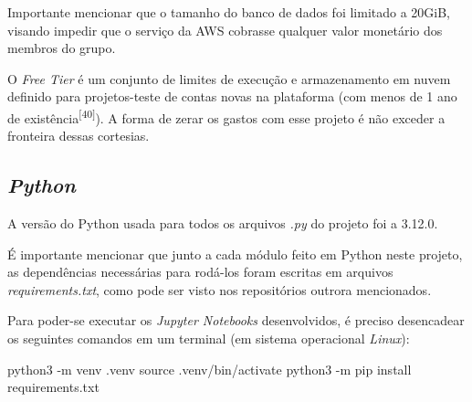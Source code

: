     Importante mencionar que o tamanho do banco de dados foi limitado a 20GiB, visando impedir que o serviço da AWS cobrasse qualquer valor monetário dos membros do grupo.
    
    O \textit{Free Tier} é um conjunto de limites de execução e armazenamento em nuvem definido para projetos-teste de contas novas na plataforma (com menos de 1 ano de existência\textsuperscript{[40]}). A forma de zerar os gastos com esse projeto é não exceder a fronteira dessas cortesias.

    
    \subsection{\textit{Python}} 

    A versão do Python usada para todos os arquivos \textit{.py} do projeto foi a 3.12.0.

    É importante mencionar que junto a cada módulo feito em Python neste projeto, as dependências necessárias para rodá-los foram escritas em arquivos \textit{requirements.txt}, como pode ser visto nos repositórios outrora mencionados.



    Para poder-se executar os \textit{Jupyter Notebooks} desenvolvidos, é preciso desencadear os seguintes comandos em um terminal (em sistema operacional \textit{Linux}):

\begin{python}
python3 -m venv .venv
source .venv/bin/activate
python3 -m pip install requirements.txt
\end{python}
    

     
     

